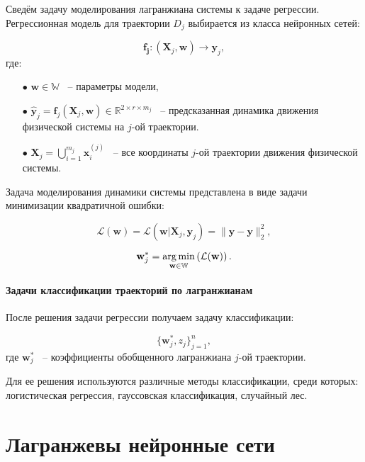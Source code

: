 \documentclass[12pt, twoside]{article}
\begin{document}
        Сведём задачу моделирования лагранжиана системы к задаче регрессии. Регрессионная модель для траектории $D_j$ выбирается из класса нейронных сетей:

        $$\mathbf{f_j} \colon (\mathbf{X}_j, \mathbf{w}) \to \mathbf{y}_j,$$ 
        где: 
    
        \begin{itemize}
    
            \item[$\bullet$] $\mathbf{w} \in \mathbb{W}$ ~-- параметры модели, 

            \item[$\bullet$] $\hat{\mathbf{y}}_j = \mathbf{f}_j (\mathbf{X}_j, \mathbf{w}) \in \mathbb{R}^{2 \times r \times m_j}$ ~-- предсказанная динамика движения физической системы на $j$-ой траектории.
        
            \item[$\bullet$] $\mathbf{X}_j = \bigcup_{i=1}^{m_j} \mathbf{x}_i^{(j)}$ ~-- все координаты $j$-ой траектории движения физической системы.
        
        \end{itemize}

        Задача моделирования динамики системы представлена в виде задачи минимизации квадратичной ошибки: 

        $$\mathcal{L}(\textbf{w}) = \mathcal{L}(\mathbf{w} | \mathbf{X}_j, \mathbf{y}_j) = \| \hat{\mathbf{y}} - \mathbf{y} \|_2^2,$$
    
        $$\textbf{w}_j^* = \argmin_{\mathbf{w} \in \mathbb{W}} \left( \mathcal{L}(\textbf{w}) \right).$$

    \paragraph{Задачи классификации траекторий по лагранжианам}

        После решения задачи регрессии получаем задачу классификации:

        $$\{\textbf{w}^*_j, z_j\}_{j=1}^n,$$
        где $\textbf{w}^*_j$ ~-- коэффициенты обобщенного лагранжиана $j$-ой траектории.
    
        Для ее решения используются различные методы классификации, среди которых: логистическая регрессия, гауссовская классификация, случайный лес.

\section{Лагранжевы нейронные сети}
\end{document}
